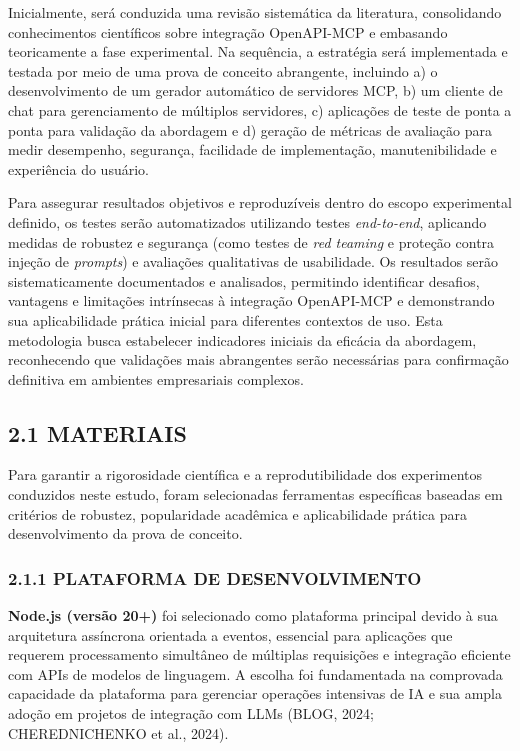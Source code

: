 \documentclass[
]{article}
\begin{document}
Inicialmente, será conduzida uma revisão sistemática da literatura,
consolidando conhecimentos científicos sobre integração OpenAPI-MCP e
embasando teoricamente a fase experimental. Na sequência, a estratégia
será implementada e testada por meio de uma prova de conceito
abrangente, incluindo a) o desenvolvimento de um gerador automático de
servidores MCP, b) um cliente de chat para gerenciamento de múltiplos
servidores, c) aplicações de teste de ponta a ponta para validação da
abordagem e d) geração de métricas de avaliação para medir desempenho,
segurança, facilidade de implementação, manutenibilidade e experiência
do usuário.

Para assegurar resultados objetivos e reproduzíveis dentro do escopo
experimental definido, os testes serão automatizados utilizando testes
\emph{end-to-end}, aplicando medidas de robustez e segurança (como
testes de \emph{red teaming} e proteção contra injeção de
\emph{prompts}) e avaliações qualitativas de usabilidade. Os resultados
serão sistematicamente documentados e analisados, permitindo identificar
desafios, vantagens e limitações intrínsecas à integração OpenAPI-MCP e
demonstrando sua aplicabilidade prática inicial para diferentes
contextos de uso. Esta metodologia busca estabelecer indicadores
iniciais da eficácia da abordagem, reconhecendo que validações mais
abrangentes serão necessárias para confirmação definitiva em ambientes
empresariais complexos.

\subsection{2.1 MATERIAIS}\label{materiais}

Para garantir a rigorosidade científica e a reprodutibilidade dos
experimentos conduzidos neste estudo, foram selecionadas ferramentas
específicas baseadas em critérios de robustez, popularidade acadêmica e
aplicabilidade prática para desenvolvimento da prova de conceito.

\subsubsection{2.1.1 PLATAFORMA DE
DESENVOLVIMENTO}\label{plataforma-de-desenvolvimento}

\textbf{Node.js (versão 20+)} foi selecionado como plataforma principal
devido à sua arquitetura assíncrona orientada a eventos, essencial para
aplicações que requerem processamento simultâneo de múltiplas
requisições e integração eficiente com APIs de modelos de linguagem. A
escolha foi fundamentada na comprovada capacidade da plataforma para
gerenciar operações intensivas de IA e sua ampla adoção em projetos de
integração com LLMs (BLOG, 2024; CHEREDNICHENKO et al., 2024).
\end{document}
